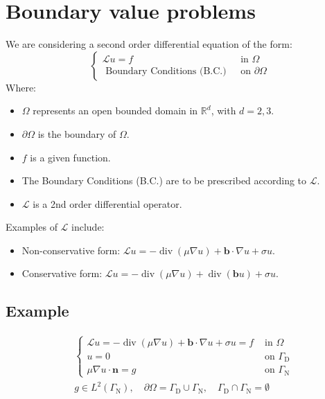 \documentclass[11pt]{book}
\begin{document}
\section{Boundary value problems}
We are considering a second order differential equation of the form:
\begin{equation}
\begin{cases}
\mathcal{L} u=f & \text { in } \Omega \\
\text { Boundary Conditions (B.C.) } & \text { on } \partial \Omega
\end{cases}
\end{equation}
Where:
\begin{itemize}
\item $\Omega$ represents an open bounded domain in $\mathbb{R}^{d}$, with $d=2,3$.
\item $\partial \Omega$ is the boundary of $\Omega$.
\item $f$ is a given function.
\item The Boundary Conditions (B.C.) are to be prescribed according to $\mathcal{L}$.
\item $\mathcal{L}$ is a 2nd order differential operator.
\end{itemize}
Examples of $\mathcal{L}$ include:
\begin{itemize}
\item Non-conservative form: $\mathcal{L} u=-\operatorname{div}(\mu \nabla u)+\mathbf{b} \cdot \nabla u+\sigma u$.
\item Conservative form: $\mathcal{L} u=-\operatorname{div}(\mu \nabla u)+\operatorname{div}(\mathbf{b} u)+\sigma u$.
\end{itemize}
\subsection*{Example}

\begin{equation}
\begin{aligned}
& \begin{cases}\mathcal{L} u=-\operatorname{div}(\mu \nabla u)+\mathbf{b} \cdot \nabla u+\sigma u=f & \text { in } \Omega \\
u=0 & \text { on } \Gamma_{\mathrm{D}} \\
\mu \nabla u \cdot \mathbf{n}=g & \text { on } \Gamma_{\mathrm{N}}\end{cases} \\
& g \in L^{2}\left(\Gamma_{\mathrm{N}}\right), \quad \partial \Omega=\Gamma_{\mathrm{D}} \cup \Gamma_{\mathrm{N}}, \quad \Gamma_{\mathrm{D}} \cap \Gamma_{\mathrm{N}}=\emptyset
\end{aligned}
\end{equation}
\end{document}
